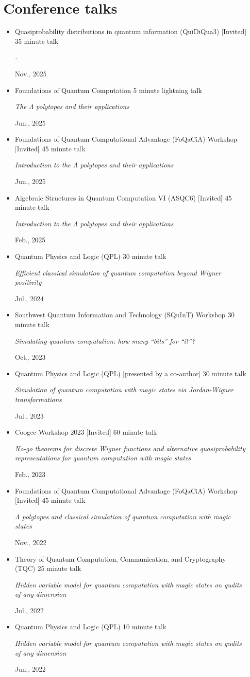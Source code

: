 \documentclass[letterpaper,11pt]{article}
\newcommand{\ConferenceItem}[4]{
	\item{\parbox{0.97\textwidth}{
		{#1} \hfill {#2}\\
		\parbox{0.86\textwidth}{\emph{#3}} \hfill {#4}
	}}
}
\begin{document}
\section*{Conference talks}
\begin{itemize}[leftmargin=*]
	\ConferenceItem{Quasiprobability distributions in quantum information (QuiDiQua3) [Invited]}{35 minute talk}{-}{Nov., 2025}
	
	\ConferenceItem{Foundations of Quantum Computation}{5 minute lightning talk}{The $\Lambda$ polytopes and their applications}{Jun., 2025}
	
	\ConferenceItem{Foundations of Quantum Computational Advantage (FoQaCiA) Workshop [Invited]}{45 minute talk}{Introduction to the $\Lambda$ polytopes and their applications}{Jun., 2025}
	
	\ConferenceItem{Algebraic Structures in Quantum Computation VI (ASQC6) [Invited]}{45 minute talk}{Introduction to the $\Lambda$ polytopes and their applications}{Feb., 2025}
	
	\ConferenceItem{Quantum Physics and Logic (QPL)}{30 minute talk}{Efficient classical simulation of quantum computation beyond Wigner positivity}{Jul., 2024}
	
	\ConferenceItem{Southwest Quantum Information and Technology (SQuInT) Workshop}{30 minute talk}{Simulating quantum computation: how many ``bits'' for ``it''?}{Oct., 2023}
	
	\ConferenceItem{Quantum Physics and Logic (QPL) [presented by a co-author]}{30 minute talk}{Simulation of quantum computation with magic states via Jordan-Wigner transformations}{Jul., 2023}
	
	\ConferenceItem{Coogee Workshop 2023 [Invited]}{60 minute talk}{No-go theorems for discrete Wigner functions and alternative quasiprobability representations for quantum computation with magic states}{Feb., 2023}
	
	\ConferenceItem{Foundations of Quantum Computational Advantage (FoQaCiA) Workshop [Invited]}{45 minute talk}{$\Lambda$ polytopes and classical simulation of quantum computation with magic states}{Nov., 2022}
	
	\ConferenceItem{Theory of Quantum Computation, Communication, and Cryptography (TQC)}{25 minute talk}{Hidden variable model for quantum computation with magic states on qudits of any dimension}{Jul., 2022}
	
	\ConferenceItem{Quantum Physics and Logic (QPL)}{10 minute talk}{Hidden variable model for quantum computation with magic states on qudits of any dimension}{Jun., 2022}
	

\end{itemize}
\end{document}
